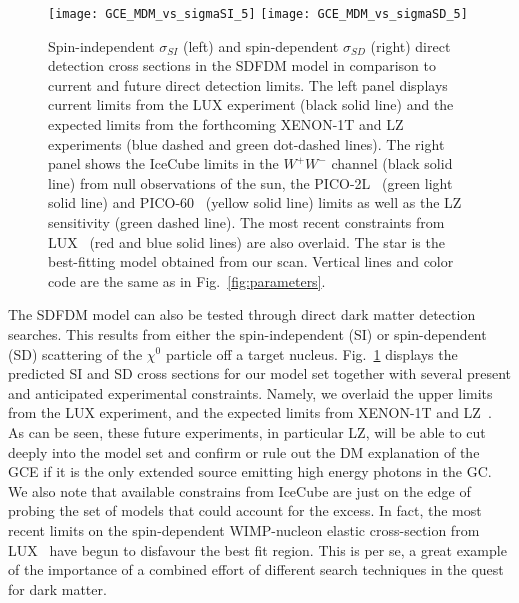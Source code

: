 %
\begin{figure}[t]
\begin{center}
\texttt{[image: GCE\_MDM\_vs\_sigmaSI\_5]}  
\texttt{[image: GCE\_MDM\_vs\_sigmaSD\_5]} 
\caption{Spin-independent $\sigma_{SI}$ (left) and spin-dependent $\sigma_{SD}$ (right) direct detection cross sections in the SDFDM model in comparison to current and future direct detection limits. 
The left panel displays current limits from the LUX experiment (black solid line) and the expected limits from the forthcoming XENON-1T and LZ~\cite{Cushman:2013zza} experiments (blue dashed and green dot-dashed lines).
The right panel shows the IceCube limits in the $W^+W^-$ channel (black solid line) from null observations of the sun,  the PICO-2L~\cite{Amole:2016pye} (green light solid line) and PICO-60~\cite{Amole:2015pla} (yellow solid line) limits as well as the LZ sensitivity (green dashed line). The most recent constraints from LUX~\cite{Akerib:2016lao} (red and blue solid lines) are also overlaid. 
The star is the best-fitting model obtained from our scan. 
Vertical lines and color code are the same as in Fig.~\ref{fig:parameters}.
}
\label{fig:sigma-SI-SD}
\end{center}
\end{figure}
%
The SDFDM model can also be tested through direct dark matter detection searches. This results from either the spin-independent (SI) or spin-dependent (SD) scattering of the $\chi^0$ particle off a target nucleus. Fig.~\ref{fig:sigma-SI-SD} displays the predicted SI and SD cross sections for our model set together with several present and anticipated experimental constraints. Namely, we overlaid the upper limits from the LUX experiment, and the expected limits from XENON-1T and LZ~\cite{Cushman:2013zza}. As can be seen, these future experiments, in particular LZ, will be able to cut deeply into the model set and confirm or rule out the DM explanation of the GCE if it is the only extended source emitting high energy photons in the GC. We also note that available constrains from IceCube are just on the edge of probing the set of models that could account for the excess. In fact, the most recent limits on the spin-dependent WIMP-nucleon elastic cross-section from LUX~\cite{Akerib:2016lao} have begun to disfavour the best fit region. This is per se, a great example of the importance of a combined effort of different search techniques in the quest for dark matter.    
 

